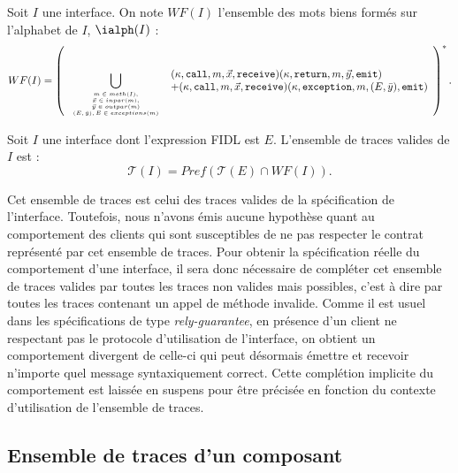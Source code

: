 \begin{definition}
\label{def:motswf}
  Soit $I$ une interface. On note $WF(I)$ l'ensemble des mots \og biens
  form\'es \fg{} sur l'alphabet de $I$, $\ialph(I)$ :
$$WF(I) = \left(~\bigcup_{\tiny{\begin{array}{c}m \in meth(I),\\
            \vec{x} \in inpar(m),\\ \vec{y} \in outpar(m)\\
            (E,\bar{y}), E\in exceptions(m)
  \end{array}}}
\begin{array}{l}
(\kappa, \mathtt{call}, m, \vec{x}, \mathtt{receive})(\kappa, \mathtt{return}, m,
  \vec{y}, \mathtt{emit})\\
+ (\kappa, \mathtt{call}, m, \vec{x}, \mathtt{receive})(\kappa, \mathtt{exception}, m,
  (E,\bar{y}), \mathtt{emit})\\
\end{array}\right)^*.$$
\end{definition}

\begin{definition}
\label{def:traces-interfaces}
  Soit $I$ une interface dont l'expression \textsf{FIDL} est $E$.
  L'ensemble de traces valides de $I$ est :
$$\mathcal{T}(I) =  Pref(\mathcal{T}(E) \cap WF(I)).$$
\end{definition}

Cet ensemble de traces est celui des traces valides de la
sp\'ecification de l'interface. Toutefois, nous n'avons \'emis aucune
hypoth\`ese quant au comportement des clients qui sont susceptibles de
ne pas respecter le \og contrat\fg{}~ repr\'esent\'e par cet ensemble de
traces. Pour obtenir la sp\'ecification r\'eelle du comportement d'une
interface, il sera donc n\'ecessaire de compl\'eter cet ensemble de traces
valides par toutes les traces non valides mais possibles, c'est \`a dire
par toutes les traces contenant un appel de m\'ethode invalide.  Comme
il est usuel dans les sp\'ecifications de type \emph{rely-guarantee}, en pr\'esence d'un client ne respectant pas le
protocole d'utilisation de l'interface, on obtient un 
comportement divergent de celle-ci qui peut d\'esormais \'emettre et
recevoir n'importe quel message syntaxiquement correct. 
Cette compl\'etion implicite du comportement est laiss\'ee en
suspens pour \^etre pr\'ecis\'ee en fonction du contexte
d'utilisation de l'ensemble de traces. 

\subsection{Ensemble de traces d'un composant}
\label{sec:ensemble-de-traces-composants}

